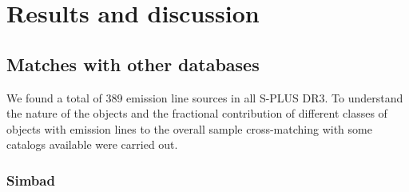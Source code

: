 \documentclass[fleqn,usenatbib]{mnras}
\begin{document}
\section{Results and discussion}
\label{sec:results}

\subsection{Matches with other databases}
\label{sec:matches}
We found a total of 389 emission line sources in all S-PLUS DR3.
To understand the nature of the objects  and the fractional
contribution of different classes of objects with emission lines
to the overall sample cross-matching with some catalogs available were carried out.

\subsubsection{Simbad}
\end{document}

